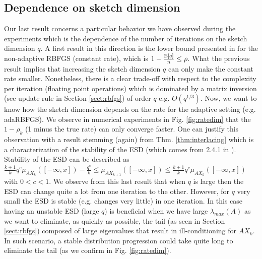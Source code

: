 \documentclass[12pt,conference,compsocconf]{IEEEtran}
\newcommand{\E}{{\rm I\kern-.3em E}}
\begin{document}
\subsection{Dependence on sketch dimension}\label{sect:sketchdim}
Our last result concerns a particular behavior we have observed during the experiments which is the dependence of the number of iterations on the sketch dimension $q$. A first result in this direction is the lower bound presented in \cite{Gower1} for the non-adaptive RBFGS (constant rate), which is $1-\frac{\E[q]}{n}\leq \rho $. What the previous result implies that increasing the sketch dimension $q$ can only make the constant rate smaller. Nonetheless, there is a clear trade-off with respect to the complexity per iteration (floating point operations) which is dominated by a matrix inversion (see update rule in Section \ref{sect:rbfgs}) of order $q$ e.g. $O(q^{1/3})$. Now, we want to know how the sketch dimension depends on the rate for the adaptive setting (e.g. adaRBFGS). We observe in numerical experiments in Fig. \ref{fig:ratedim} that the $1-\rho_k$ (1 minus the true rate) can only converge faster. One can justify this observation with a result stemming (again) from Thm. \ref{thm:interlacing} which is a characterization of the stability of the ESD (which comes from 2.4.1 in \cite{Tao}). Stability of the ESD can be described as $\frac{k+1}{k}q^c\mu_{AX_k}([-\infty,x])-\frac{q^c}{k} \leq \mu_{AX_{k+1}}([-\infty,x])\leq \frac{k+1}{k}q^c\mu_{AX_k}([-\infty,x])$ with $0<c<1$. We observe from this last result that when $q$ is large then the ESD can change quite a lot from one iteration to the other. However, for $q$ very small the ESD is stable (e.g. changes very little) in one iteration. In this case having an unstable ESD (large $q$) is beneficial when we have large $\lambda_{max}(A)$ as we want to eliminate, as quickly as possible, the tail  (as seen in Section \ref{sect:rbfgs}) composed of large eigenvalues that result in ill-conditioning for $AX_k$. In such scenario, a stable distribution progression could take quite long to eliminate the tail (as we confirm in Fig. \ref{fig:ratedim}).
\end{document}
